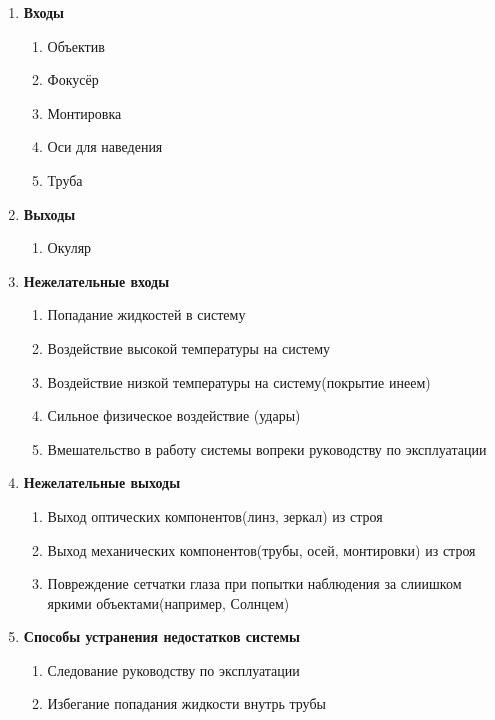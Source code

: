 \begin{enumerate}
    \item \textbf{Входы}
    \begin{enumerate}[label*=\arabic*.]
        \item Объектив
        \item Фокусёр
        \item Монтировка
        \item Оси для наведения
        \item Труба
    \end{enumerate}
    \item \textbf{Выходы}
    \begin{enumerate}[label*=\arabic*.]
        \item Окуляр
    \end{enumerate}
    \item \textbf{Нежелательные входы}
    \begin{enumerate}[label*=\arabic*.]
        \item Попадание жидкостей в систему
        \item Воздействие высокой температуры на систему
        \item Воздействие низкой температуры на систему(покрытие инеем)
        \item Сильное физическое воздействие (удары)
        \item Вмешательство в работу системы вопреки руководству по эксплуатации
    \end{enumerate}
    \item \textbf{Нежелательные выходы}
    \begin{enumerate}[label*=\arabic*.]
        \item Выход оптических компонентов(линз, зеркал) из строя
        \item Выход механических компонентов(трубы, осей, монтировки) из строя
        \item Повреждение сетчатки глаза при попытки наблюдения за слиишком яркими объектами(например, Солнцем)
    \end{enumerate}
    \item \textbf{Способы устранения недостатков системы}
    \begin{enumerate}[label*=\arabic*.]
        \item Следование руководству по эксплуатации
        \item Избегание попадания жидкости внутрь трубы
    \end{enumerate}
\end{enumerate}